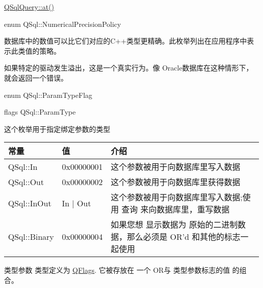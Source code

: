 \begin{seeAlso}
\href{https://doc.qt.io/qt-5/qsqlquery.html#at}{QSqlQuery::at()}
\end{seeAlso}

enum QSql::NumericalPrecisionPolicy


数据库中的数值可以比它们对应的C++类型更精确。此枚举列出在应用程序中表示此类值的策略。



\begin{notice}
如果特定的驱动发生溢出，这是一个真实行为。像 Oracle数据库在这种情形下，就会返回一个错误。
\end{notice}

enum QSql::ParamTypeFlag


flags QSql::ParamType


这个枚举用于指定绑定参数的类型

\begin{tabular}{|l|l|l|}
	\hline
	常量	& 值 & 介绍 \\
	\hline
	QSql::In&0x00000001&这个参数被用于向数据库里写入数据\\
	\hline
	QSql::Out&0x00000002&这个参数被用于向数据库里获得数据\\
	\hline
	QSql::InOut&In | Out&这个参数被用于向数据库里写入数据;使用 查询 来向数据库里，重写数据\\
	\hline
	QSql::Binary&0x00000004&如果您想 显示数据为 原始的二进制数据，那么必须是 OR'd 和其他的标志一 起使用\\
	\hline
\end{tabular}

类型参数 类型定义为 \href{https://doc.qt.io/qt-5/qflags.html}{QFlags}. 它被存放在 一个 OR与 类型参数标志的值 的组合。





